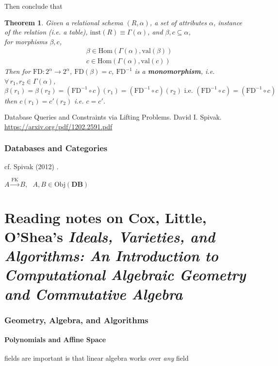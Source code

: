 \documentclass[10pt]{amsart}
\newtheorem{theorem}{Theorem}
\begin{document}
\begin{multicols*}{2}
Then conclude that 
\begin{theorem}
	Given a relational schema $(R, \alpha)$, a set of attributes $\alpha$, instance of the relation (i.e. a table), $\text{inst}(R) \equiv \Gamma(\alpha)$, and $\beta, c \subseteq \alpha$, \\ for morphisms $\beta, c$, 
\[	\begin{aligned}
		& \beta \in \text{Hom}(\Gamma(\alpha), \text{val}(\beta)) \\
		& c \in \text{Hom}(\Gamma(\alpha), \text{val}(c))
	\end{aligned}
	\]
Then for $\text{FD}:2^{\alpha} \to 2^{\alpha}$, $\text{FD}(\beta) =c$, $\text{FD}^{-1}$ is a \textbf{monomorphism}, i.e. $\forall \, r_1, r_2 \in \Gamma(\alpha)$,
\[
\beta(r_1) = \beta(r_2) = (\text{FD}^{-1}\circ c)(r_1) = (\text{FD}^{-1}\circ c)(r_2) \text{ i.e. } (\text{FD}^{-1}\circ c) = (\text{FD}^{-1} \circ c)
\]
then $c(r_1) = c'(r_2) $ i.e. $c=c'$.
\end{theorem}

Database Queries and Constraints via Lifting Problems. David I. Spivak.
\url{https://arxiv.org/pdf/1202.2591.pdf}

\section{Databases and Categories}

cf. Spivak (2012) \cite{Spiv2012}.

$A \xrightarrow{\text{FK}} B$, \, $A, B \in \text{Obj}(\mathbf{DB})$


\part{Reading notes on Cox, Little, O'Shea's \emph{Ideals, Varieties, and Algorithms: An Introduction to Computational Algebraic Geometry and Commutative Algebra}}

\section{Geometry, Algebra, and Algorithms}

\subsection{Polynomials and Affine Space}

fields are important is that linear algebra works over \emph{any} field


\end{multicols*}
\end{document}
